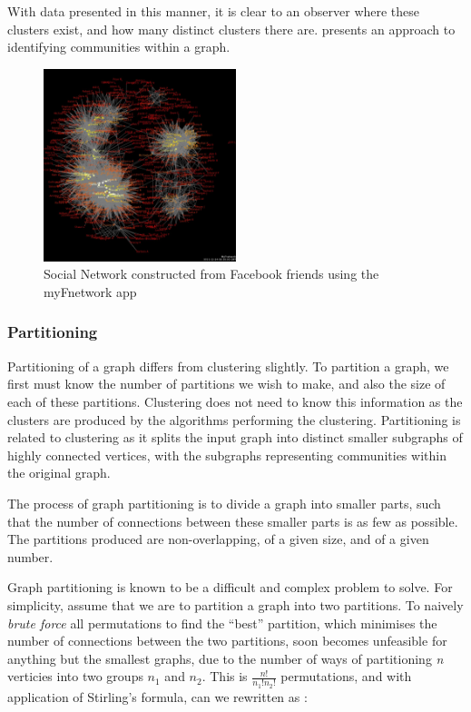 With data presented in this manner, it is clear to an observer where these clusters exist, and how many distinct clusters there are. \cite{girvan02} presents an approach to identifying communities within a graph.

\begin{figure}[htbp]
\centering
\includegraphics[width=0.5\textwidth]{./img/socialnetwork.png}
\caption{Social Network constructed from Facebook friends using the myFnetwork app}
\label{fig:socialnetwork}
\end{figure}

\subsubsection{Partitioning}
Partitioning of a graph differs from clustering slightly. To partition a graph, we first must know the number of partitions we wish to make, and also the size of each of these partitions. Clustering does not need to know this information as the clusters are produced by the algorithms performing the clustering. Partitioning is related to clustering as it splits the input graph into distinct smaller subgraphs of highly connected vertices, with the subgraphs representing communities within the original graph.

The process of graph partitioning is to divide a graph into smaller parts, such that the number of connections between these smaller parts is as few as possible. The partitions produced are non-overlapping, of a given size, and of a given number.

Graph partitioning is known to be a difficult and complex problem to solve. For simplicity, assume that we are to partition a graph into two partitions. To naively \emph{brute force} all permutations to find the ``best'' partition, which minimises the number of connections between the two partitions, soon becomes unfeasible for anything but the smallest graphs, due to the number of ways of partitioning \emph{n} verticies into two groups \emph{$n_1$} and \emph{$n_2$}. This is $\frac{n!}{n_1!n_2!}$ permutations, and with application of Stirling's formula, can we rewritten as \cite{newman10}:

